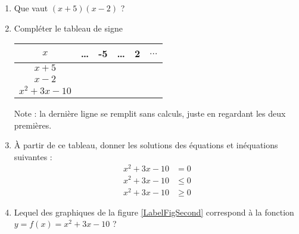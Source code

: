 
\begin{exercice}\label{exoPremiere-0030}


\begin{enumerate}
    \item
        Que vaut \( (x+5)(x-2)\) ?
    \item
        Compléter le tableau de signe
        \begin{center}
            \begin{tabular}[h]{|c||c|c|c|c|c|}
                \hline
                    \( x\)&\ldots&-5&\ldots&2&\( \ldots\)\\
                    \hline
                    \( x+5\)&&&&& \\
                    \hline
                    \( x-2\)&&&&&\\
                    \hline\hline
                    \(x^2+3x-10\)&&&&&\\
                    \hline
            \end{tabular}
        \end{center}
        Note : la dernière ligne se remplit sans calculs, juste en regardant les deux premières.
    \item
        À partir de ce tableau, donner les solutions des équations et inéquations suivantes :
        \begin{subequations}
            \begin{align}
                x^2+3x-10&=0\\
                x^2+3x-10&\leq0\\
                x^2+3x-10&\geq0
            \end{align}
        \end{subequations}
    \item
        Lequel des graphiques de la figure \ref{LabelFigSecond} correspond à la fonction \( y=f(x)=x^2+3x-10\) ?
\newcommand{\CaptionFigSecond}{Laquelle de ces trois courbes est \( x^2+3x-10\) ?}

\end{enumerate}

\end{exercice}
